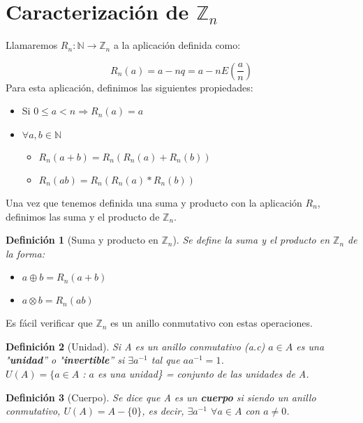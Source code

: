 \documentclass[11pt, a4paper, titlepage]{article}
\providecommand{\ent}{\mathbb{Z}}
\theoremstyle{theorem-style}
\theoremstyle{definition-style}
\newtheorem*{ndef}{Definición}
\theoremstyle{remark-style}
\theoremstyle{example-style}
\begin{document}
\section*{Caracterización de $\mathbb{Z}_{n}$}

Llamaremos $R_n:\mathbb{N} \rightarrow \mathbb{Z}_n$ a la aplicación definida como:

\[
R_n(a) = a - nq = a- nE(\frac{a}{n})
\] 
Para esta aplicación, definimos las siguientes propiedades:

\begin{itemize}
\item Si $0 \leq a < n  \Rightarrow R_n(a) = a$
\item $\forall a,b \in \mathbb{N}$

\begin{itemize}
	\item  $R_n(a+b) = R_n(R_n(a) + R_n(b))$
	\item $R_n(ab) = R_n(R_n(a)*R_n(b))$
\end{itemize}

\end{itemize} 
\pagebreak

Una vez que tenemos definida una suma y producto con la aplicación $R_n$, definimos las suma y el producto de $\mathbb{Z}_n$.
\begin{ndef}[Suma y producto en $\ent_n$] Se define la suma y el producto en $\ent_n$ de la forma:
	\begin{itemize}
	\item $a\oplus b = R_n(a+b)$
	\item $a\otimes b = R_n(ab)$
\end{itemize}

\end{ndef}



Es fácil verificar que $\mathbb{Z}_n$ es un anillo conmutativo con estas operaciones.\\

\begin{ndef}[Unidad]
	Si A es un anillo conmutativo (a.c) $a \in A$ es una "\textbf{unidad}” o "\textbf{invertible}” si $\exists a^{-1}$ tal que $ aa^{-1} = 1$.\\ $U(A) = \{ a \in A$ : $a$ es una unidad\} = conjunto de las unidades de A.\\
\end{ndef}



\begin{ndef}[Cuerpo] Se dice que A es un \textbf{cuerpo} si siendo un anillo conmutativo, $U(A) = A - \{0\}$, es decir, $\exists a^{-1}$ $\forall a \in A$ con $a \neq 0$.
\end{ndef}
\end{document}
